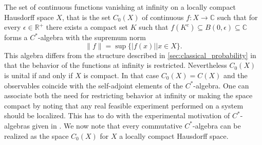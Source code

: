 \begin{example}
The set of continuous functions vanishing at infinity on a locally compact Hausdorff space $X$, that is the set $C_0(X)$ of continuous $f:X\rightarrow \mathbb{C}$ such that for every $\epsilon\in\mathbb{R}^+$ there exists a compact set $K$ such that $f(K^c)\subseteq B(0,\epsilon) \subseteq \mathbb{C}$ forms a $C^*$-algebra with the supremum norm
\begin{equation}
\|f\| = \sup\{|f(x)||x\in X\}.
\end{equation}
This algebra differs from the structure described in \ref{sec:classical_probability} in that the behavior of the functions at infinity is restricted. Nevertheless $C_0(X)$ is unital if and only if $X$ is compact. In that case $C_0(X)=C(X)$ and the observables coincide with the self-adjoint elements of the $C^*$-algebra. One can associate both the need for restricting behavior at infinity or making the space compact by noting that any real feasible experiment performed on a system should be localized. This has to do with the experimental motivation of $C^*$-algebras given in \cite{Strocchi2008a}.
We now note that every commutative $C^*$-algebra can be realized as the space $C_0(X)$ for $X$ a locally compact Hausdorff space\cite{Bratteli1997}. 
\end{example}

